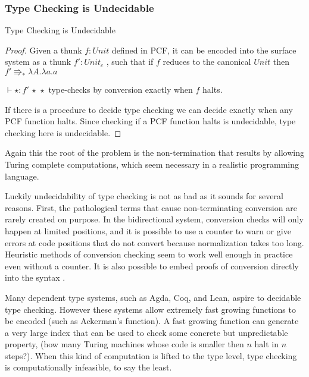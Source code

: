 \subsubsection{Type Checking is Undecidable}
\begin{thm}
Type Checking is Undecidable
\end{thm}

\begin{proof}
Given a thunk $f:Unit$ defined in PCF, it can be encoded into the surface system as a thunk $f':Unit_{c}$ , such that if $f$ reduces to the canonical $Unit$ then $f'\Rrightarrow_{\ast}\lambda A.\lambda a.a$ 

$\vdash\star:f'\,\star\,\star$ type-checks by conversion exactly when $f$ halts.

If there is a procedure to decide type checking we can decide exactly when any PCF function halts.
Since checking if a PCF function halts is undecidable, type checking here is undecidable.

\end{proof}
Again this the root of the problem is the non-termination that results by allowing Turing complete computations, which seem necessary in a realistic programming language.

Luckily undecidability of type checking is not as bad as it sounds for several reasons.
First, the pathological terms that cause non-terminating conversion are rarely created on purpose.
In the bidirectional system, conversion checks will only happen at limited positions, and it is possible to use a counter to warn or give errors at code positions that do not convert because normalization takes too long.
Heuristic methods of conversion checking seem to work well enough in practice even without a counter.
It is also possible to embed proofs of conversion directly into the syntax \cite{sjoberg2012irrelevance}.

Many dependent type systems, such as Agda, Coq, and Lean, aspire to decidable type checking.
However these systems allow extremely fast growing functions to be encoded (such as Ackerman's function).
A fast growing function can generate a very large index that can be used to check some concrete but unpredictable property, (how many Turing machines whose code is smaller then $n$ halt in $n$ steps?).
When this kind of computation is lifted to the type level, type checking is computationally infeasible, to say the least.


